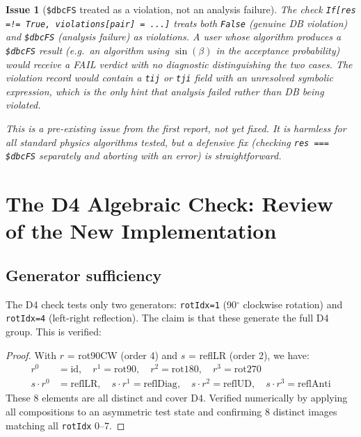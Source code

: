 \documentclass[12pt,a4paper]{article}
\theoremstyle{critical}
\newtheorem{issue}{Issue}
\theoremstyle{remark}
\theoremstyle{verified}
\begin{document}
\begin{issue}[\texttt{\$dbcFS} treated as a violation, not an analysis failure]
\label{issue:dbcfs}
The check \texttt{If[res =!= True, violations[pair] = ...]} treats both
\texttt{False} (genuine DB violation) and \texttt{\$dbcFS} (analysis failure)
as violations.  A user whose algorithm produces a \texttt{\$dbcFS} result (e.g.\
an algorithm using $\sin(\beta)$ in the acceptance probability) would receive a
FAIL verdict with no diagnostic distinguishing the two cases.  The violation
record would contain a \texttt{tij} or \texttt{tji} field with an unresolved
symbolic expression, which is the only hint that analysis failed rather than DB
being violated.

This is a pre-existing issue from the first report, not yet fixed.  It is
harmless for all standard physics algorithms tested, but a defensive fix (checking
\texttt{res === \$dbcFS} separately and aborting with an error) is
straightforward.
\end{issue}

\section{The D4 Algebraic Check: Review of the New Implementation}
\label{sec:d4}

\subsection{Generator sufficiency}

The D4 check tests only two generators: \texttt{rotIdx=1} (90\(^\circ\) clockwise
rotation) and \texttt{rotIdx=4} (left-right reflection).  The claim is that
these generate the full D4 group.  This is verified:

\begin{proof}
With $r$ = rot90CW (order 4) and $s$ = reflLR (order 2), we have:
\begin{align*}
  r^0 &= \text{id},\quad r^1 = \text{rot90},\quad r^2 = \text{rot180},\quad r^3 = \text{rot270}\\
  s\cdot r^0 &= \text{reflLR},\quad s\cdot r^1 = \text{reflDiag},\quad
  s\cdot r^2 = \text{reflUD},\quad s\cdot r^3 = \text{reflAnti}
\end{align*}
These 8 elements are all distinct and cover D4.  Verified numerically by applying
all compositions to an asymmetric test state and confirming 8 distinct images
matching all \texttt{rotIdx} 0--7.
\end{proof}
\end{document}

